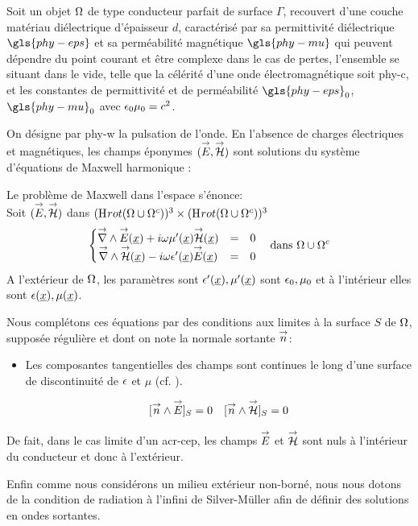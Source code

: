 Soit un objet $\Omega$ de type conducteur parfait de surface $\Gamma$, recouvert d'une couche matériau diélectrique d'épaisseur $d$, caractérisé par sa permittivité diélectrique $\gls{phy-eps}$ et sa perméabilité magnétique $\gls{phy-mu}$ qui peuvent dépendre du point courant et être complexe dans le cas de pertes, l'ensemble se situant dans le vide, telle que la célérité d'une onde électromagnétique soit \gls{phy-c}, et les constantes de permittivité et de perméabilité $\gls{phy-eps}_0$, $\gls{phy-mu}_0$ avec $\epsilon_0\mu_0 = c^{2}$.


On désigne par \gls{phy-w} la pulsation de l'onde.
En l'absence de charges électriques et magnétiques, les champs éponymes $( {\overset{\rightarrow}{E}}, {\overset{\rightarrow}{\mathcal{H}}} )$ sont solutions du système d'équations de Maxwell harmonique : 

Le problème de Maxwell dans l'espace s'énonce: \\

Soit $({\overset{\rightarrow}{E}},{\overset{\rightarrow}{\mathcal{H}}})$ dans $(\mathrm{H}_\mathrm{{}}{rot}(\Omega\cup\Omega^c))^3 \times (\mathrm{H}_\mathrm{{}}{rot}(\Omega\cup\Omega^c))^3$
\begin{equation}
\label{eq:pres_th:intro:maxwell}
\left\lbrace \begin{matrix}
{\overset{\rightarrow}{\nabla}}\wedge {\overset{\rightarrow}{E}}(\underline{x}) + i\omega\mu'(\underline{x}) {\overset{\rightarrow}{\mathcal{H}}}(\underline{x}) &=& 0 \\
{\overset{\rightarrow}{\nabla}}\wedge {\overset{\rightarrow}{\mathcal{H}}}(\underline{x}) - i\omega\epsilon'(\underline{x}) {\overset{\rightarrow}{E}}(\underline{x}) &=& 0 \\
\end{matrix} \right.
\quad \text{dans $\Omega\cup\Omega^c$}
\end{equation}
A l'extérieur de $\Omega$, les paramètres sont $\epsilon'(\underline{x}),\mu'(\underline{x})$ sont $\epsilon_0,\mu_0$ et à l'intérieur elles sont $\epsilon(\underline{x}),\mu(\underline{x})$.


Nous complétons ces équations par des conditions aux limites à la surface $S$ de $\Omega$, supposée régulière et dont on note la normale sortante ${\overset{\rightarrow}{n}}$:
\begin{itemize}
  \item Les composantes tangentielles des champs sont continues le long d'une surface de discontinuité de $\epsilon$ et $\mu$ (cf. \cite[(2.10) p.~8]{senior_approximate_1995}).

  \begin{align}
  \label{eq:pres_th:intro:transmissions}[{\overset{\rightarrow}{n}} \wedge {\overset{\rightarrow}{E}}]_S = 0  \quad [{\overset{\rightarrow}{n}} \wedge {\overset{\rightarrow}{\mathcal{H}}}]_S = 0
  \end{align}
\end{itemize}
De fait, dans le cas limite d'un \gls{acr-cep}, les champs ${\overset{\rightarrow}{E}}$ et ${\overset{\rightarrow}{\mathcal{H}}}$ sont nuls à l'intérieur du conducteur et donc à l'extérieur.


Enfin comme nous considérons un milieu extérieur non-borné, nous nous dotons de la condition de radiation à l'infini de Silver-Müller afin de définir des solutions en ondes sortantes.


